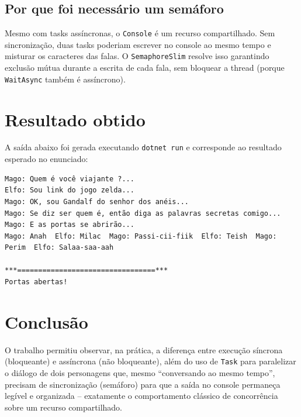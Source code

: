 \documentclass[12pt,a4paper]{article}
\begin{document}
\subsection{Por que foi necessário um semáforo}

Mesmo com tasks assíncronas, o \texttt{Console} é um recurso compartilhado. Sem
sincronização, duas tasks poderiam escrever no console ao mesmo tempo e misturar
os caracteres das falas. O \texttt{SemaphoreSlim} resolve isso garantindo exclusão
mútua durante a escrita de cada fala, sem bloquear a thread (porque
\texttt{WaitAsync} também é assíncrono).

\section{Resultado obtido}

A saída abaixo foi gerada executando \texttt{dotnet run} e corresponde ao
resultado esperado no enunciado:

\begin{lstlisting}[numbers=none,basicstyle=\ttfamily\scriptsize]
Mago: Quem é você viajante ?...
Elfo: Sou link do jogo zelda...
Mago: OK, sou Gandalf do senhor dos anéis...
Mago: Se diz ser quem é, então diga as palavras secretas comigo...
Mago: E as portas se abrirão...
Mago: Anah  Elfo: Milac  Mago: Passi-cii-fiik  Elfo: Teish  Mago: Perim  Elfo: Salaa-saa-aah

***=================================***
Portas abertas!
\end{lstlisting}

\section{Conclusão}

O trabalho permitiu observar, na prática, a diferença entre execução síncrona
(bloqueante) e assíncrona (não bloqueante), além do uso de \texttt{Task} para
paralelizar o diálogo de dois personagens que, mesmo ``conversando ao mesmo
tempo'', precisam de sincronização (semáforo) para que a saída no console
permaneça legível e organizada -- exatamente o comportamento clássico de
concorrência sobre um recurso compartilhado.
\end{document}
